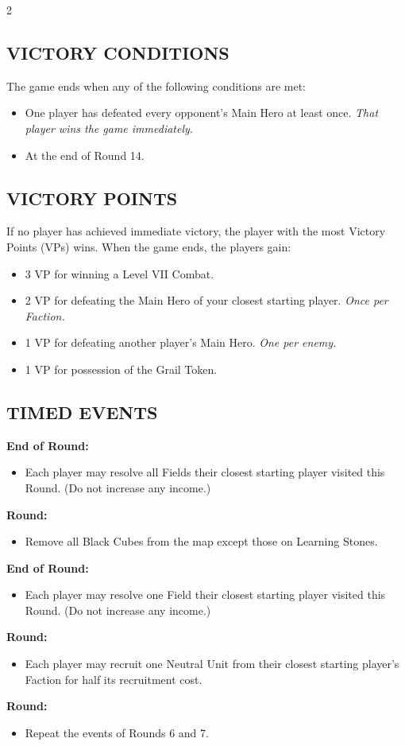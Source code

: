 \begin{multicols*}{2}
\subsection*{\MakeUppercase{Victory Conditions}}
The game ends when any of the following conditions are met:
\begin{itemize}
  \item One player has defeated every opponent's Main Hero at least once. \textit{That player wins the game immediately.}
  \item At the end of Round 14.
\end{itemize}

\subsection*{\MakeUppercase{Victory Points}}
If no player has achieved immediate victory, the player with the most Victory Points (VPs) wins. When the game ends, the players gain:
\begin{itemize}
  \item 3 VP for winning a Level VII Combat.
  \item 2 VP for defeating the Main Hero of your closest starting player. \textit{Once per Faction.}
  \item 1 VP for defeating another player's Main Hero. \textit{One per enemy.}
  \item 1 VP for possession of the Grail Token.
\end{itemize}

\subsection*{\MakeUppercase{Timed Events}}
\textbf{End of  Round:}
\begin{itemize}
  \item Each player may resolve all Fields their closest starting player visited this Round. (Do not increase any income.)
\end{itemize}
\textbf{ Round:}
\begin{itemize}
  \item Remove all Black Cubes from the map except those on Learning Stones.
\end{itemize}
\textbf{End of  Round:}
\begin{itemize}
  \item Each player may resolve one Field their closest starting player visited this Round. (Do not increase any income.)
\end{itemize}
\textbf{ Round:}
\begin{itemize}
  \item Each player may recruit one Neutral  Unit from their closest starting player's Faction for half its recruitment cost.
\end{itemize}
\textbf{ Round:}
\begin{itemize}
  \item Repeat the events of Rounds 6 and 7.
\end{itemize}


\end{multicols*}

